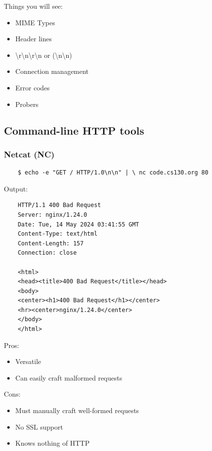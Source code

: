 \documentclass{article}
\begin{document}
Things you will see:
\begin{itemize}
    \item MIME Types
    \item Header lines
    \item \textbackslash r\textbackslash n\textbackslash r\textbackslash n or (\textbackslash n\textbackslash n)
    \item Connection management
    \item Error codes 
    \item Probers 
\end{itemize}

\subsection{Command-line HTTP tools}

\subsubsection{Netcat (NC)}

\begin{verbatim}
    $ echo -e "GET / HTTP/1.0\n\n" | \ nc code.cs130.org 80
\end{verbatim}

Output:

\begin{verbatim}
    HTTP/1.1 400 Bad Request
    Server: nginx/1.24.0
    Date: Tue, 14 May 2024 03:41:55 GMT
    Content-Type: text/html
    Content-Length: 157
    Connection: close

    <html>
    <head><title>400 Bad Request</title></head>
    <body>
    <center><h1>400 Bad Request</h1></center>
    <hr><center>nginx/1.24.0</center>
    </body>
    </html>
\end{verbatim}

Pros:
\begin{itemize}
    \item Versatile
    \item Can easily craft malformed requests
\end{itemize}

Cons:
\begin{itemize}
    \item Must manually craft well-formed requests
    \item No SSL support
    \item Knows nothing of HTTP 
\end{itemize}
\end{document}
